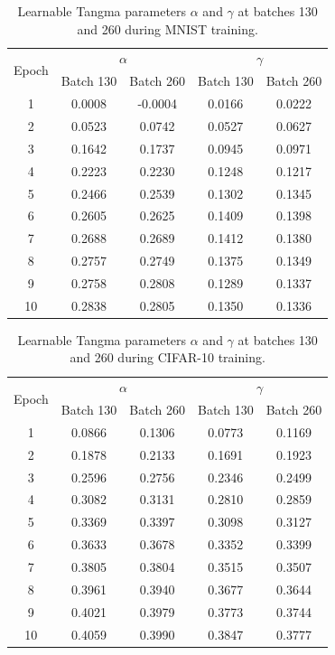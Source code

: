 \documentclass{article}
\begin{document}
\begin{table}[htbp]
\centering
\caption{Learnable Tangma parameters $\alpha$ and $\gamma$ at batches 130 and 260 during MNIST training.}
\label{tab:tangma-params-new}
\begin{tabular}{c|cc|cc}
\toprule
\multirow{2}{*}{Epoch} & \multicolumn{2}{c|}{$\alpha$} & \multicolumn{2}{c}{$\gamma$} \\
 & Batch 130 & Batch 260 & Batch 130 & Batch 260 \\
\midrule
1 & 0.0008 & -0.0004 & 0.0166 & 0.0222 \\
2 & 0.0523 & 0.0742 & 0.0527 & 0.0627 \\
3 & 0.1642 & 0.1737 & 0.0945 & 0.0971 \\
4 & 0.2223 & 0.2230 & 0.1248 & 0.1217 \\
5 & 0.2466 & 0.2539 & 0.1302 & 0.1345 \\
6 & 0.2605 & 0.2625 & 0.1409 & 0.1398 \\
7 & 0.2688 & 0.2689 & 0.1412 & 0.1380 \\
8 & 0.2757 & 0.2749 & 0.1375 & 0.1349 \\
9 & 0.2758 & 0.2808 & 0.1289 & 0.1337 \\
10 & 0.2838 & 0.2805 & 0.1350 & 0.1336 \\
\bottomrule
\end{tabular}
\end{table}













\begin{table}[htbp]
\centering
\caption{Learnable Tangma parameters $\alpha$ and $\gamma$ at batches 130 and 260 during CIFAR-10 training.}
\label{tab:tangma-params}
\begin{tabular}{c|cc|cc}
\toprule
\multirow{2}{*}{Epoch} & \multicolumn{2}{c|}{$\alpha$} & \multicolumn{2}{c}{$\gamma$} \\
 & Batch 130 & Batch 260 & Batch 130 & Batch 260 \\
\midrule
1 & 0.0866 & 0.1306 & 0.0773 & 0.1169 \\
2 & 0.1878 & 0.2133 & 0.1691 & 0.1923 \\
3 & 0.2596 & 0.2756 & 0.2346 & 0.2499 \\
4 & 0.3082 & 0.3131 & 0.2810 & 0.2859 \\
5 & 0.3369 & 0.3397 & 0.3098 & 0.3127 \\
6 & 0.3633 & 0.3678 & 0.3352 & 0.3399 \\
7 & 0.3805 & 0.3804 & 0.3515 & 0.3507 \\
8 & 0.3961 & 0.3940 & 0.3677 & 0.3644 \\
9 & 0.4021 & 0.3979 & 0.3773 & 0.3744 \\
10 & 0.4059 & 0.3990 & 0.3847 & 0.3777 \\
\bottomrule
\end{tabular}
\end{table}
\end{document}
